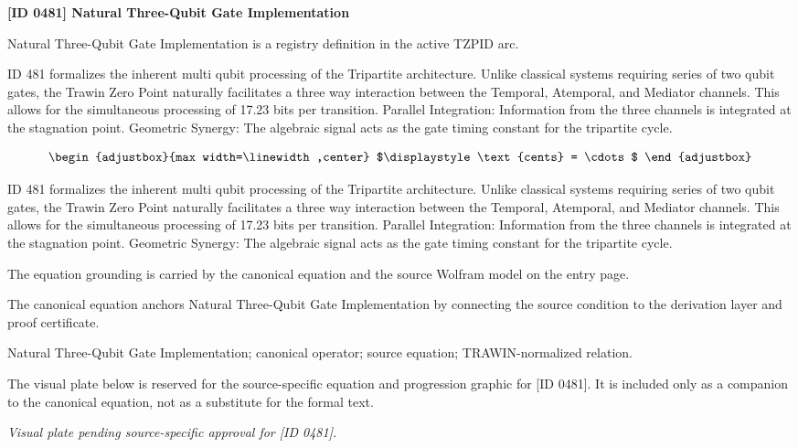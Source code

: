 \clearpage
\noindent\textbf{[ID 0481] Natural Three-Qubit Gate Implementation}\par
\vspace{0.35em}
\begingroup\small
{}
Natural Three-Qubit Gate Implementation is a registry definition in the active TZPID arc.

ID 481 formalizes the inherent multi qubit processing of the Tripartite architecture. Unlike classical systems requiring series of two qubit gates, the Trawin Zero Point naturally facilitates a three way interaction between the Temporal, Atemporal, and Mediator channels. This allows for the simultaneous processing of 17.23 bits per transition. Parallel Integration: Information from the three channels is integrated at the stagnation point. Geometric Synergy: The algebraic signal acts as the gate timing constant for the tripartite cycle.

\[
\begin{adjustbox}{max width=\linewidth,center}
$\displaystyle
\text{cents} = \cdots
$
\end{adjustbox}
\]

ID 481 formalizes the inherent multi qubit processing of the Tripartite architecture. Unlike classical systems requiring series of two qubit gates, the Trawin Zero Point naturally facilitates a three way interaction between the Temporal, Atemporal, and Mediator channels. This allows for the simultaneous processing of 17.23 bits per transition. Parallel Integration: Information from the three channels is integrated at the stagnation point. Geometric Synergy: The algebraic signal acts as the gate timing constant for the tripartite cycle.

The equation grounding is carried by the canonical equation and the source Wolfram model on the entry page.

The canonical equation anchors Natural Three-Qubit Gate Implementation by connecting the source condition to the derivation layer and proof certificate.

Natural Three-Qubit Gate Implementation; canonical operator; source equation; TRAWIN-normalized relation.
\endgroup

\begingroup\footnotesize\sloppy
The visual plate below is reserved for the source-specific equation and progression graphic for [ID 0481]. It is included only as a companion to the canonical equation, not as a substitute for the formal text.
\par\endgroup
\begingroup\footnotesize\itshape
Visual plate pending source-specific approval for [ID 0481].
\par\endgroup

